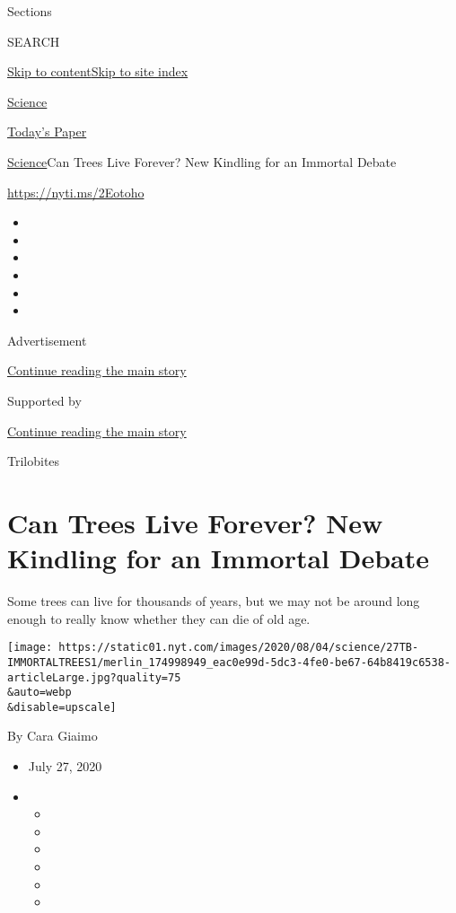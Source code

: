 Sections

SEARCH

\protect\hyperlink{site-content}{Skip to
content}\protect\hyperlink{site-index}{Skip to site index}

\href{https://www.nytimes.com/section/science}{Science}

\href{https://myaccount.nytimes.com/auth/login?response_type=cookie\&client_id=vi}{}

\href{https://www.nytimes.com/section/todayspaper}{Today's Paper}

\href{/section/science}{Science}\textbar{}Can Trees Live Forever? New
Kindling for an Immortal Debate

\url{https://nyti.ms/2Eotoho}

\begin{itemize}
\item
\item
\item
\item
\item
\item
\end{itemize}

Advertisement

\protect\hyperlink{after-top}{Continue reading the main story}

Supported by

\protect\hyperlink{after-sponsor}{Continue reading the main story}

Trilobites

\hypertarget{can-trees-live-forever-new-kindling-for-an-immortal-debate}{%
\section{Can Trees Live Forever? New Kindling for an Immortal
Debate}\label{can-trees-live-forever-new-kindling-for-an-immortal-debate}}

Some trees can live for thousands of years, but we may not be around
long enough to really know whether they can die of old age.

\texttt{[image: https://static01.nyt.com/images/2020/08/04/science/27TB-IMMORTALTREES1/merlin\_174998949\_eac0e99d-5dc3-4fe0-be67-64b8419c6538-articleLarge.jpg?quality=75\\\&auto=webp\\\&disable=upscale]}

By Cara Giaimo

\begin{itemize}
\item
  July 27, 2020
\item
  \begin{itemize}
  \item
  \item
  \item
  \item
  \item
  \item
  \end{itemize}
\end{itemize}

